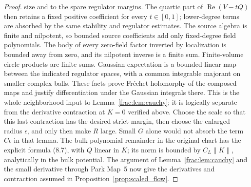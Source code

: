 \documentclass[11pt]{article}
\begin{document}
\begin{proof}
size and to the spare regulator margins. The quartic part of
\(\operatorname{Re}(V-tQ)\) then retains a fixed positive
coefficient for every \(t\in[0,1]\); lower-degree terms are
absorbed by the same stability and regulator estimates. The
source algebra is finite and nilpotent, so bounded source
coefficients add only fixed-degree field polynomials. The body
of every zero-field factor inverted by localization is bounded
away from zero, and its nilpotent inverse is a finite sum.
Finite-volume circle products are finite sums. Gaussian expectation
is a bounded linear map between the indicated regulator spaces,
with a common integrable majorant on smaller complex balls.
These facts prove Fr\'echet holomorphy of the composed maps and
justify differentiation under the Gaussian integrals there. This is the whole-neighborhood
input to Lemma~\ref{frac:lem:cauchy}; it is logically separate from
the derivative contraction at \(K=0\) verified above. Choose the
scale so that this last contraction has the desired strict margin,
then choose the enlarged radius \(\epsilon\), and only then make
\(R\) large. Small \(G\) alone would not absorb the term
\(C\epsilon\) in that lemma.
The bulk polynomial remainder in the original chart
has the explicit formula (8.7), with \(Q\) linear in \(K\);
its norm is bounded by \(C_L\|K\|\), analytically in
the bulk potential. The argument of
Lemma~\ref{frac:lem:cauchy} and the small derivative
through Park Map~5 now give the derivatives and
contraction assumed in Proposition~\ref{prop:scaled_flow}.


\end{proof}
\end{document}
